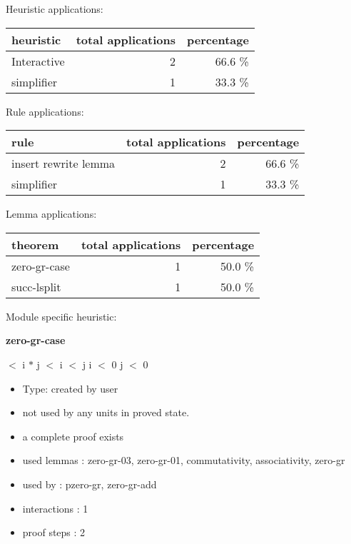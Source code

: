 \documentclass[a4paper]{article}
\begin{document}
\medskip


Heuristic applications:

\begin{supertabular}{l|r|r}
heuristic	& total applications & percentage \\ \hline
Interactive & 2 & 66.6 \% \\
simplifier & 1 & 33.3 \% \\

\end{supertabular}

Rule applications:

\begin{supertabular}{l|r|r}
rule	        & total applications & percentage \\ \hline
insert rewrite lemma & 2 & 66.6 \% \\
simplifier & 1 & 33.3 \% \\

\end{supertabular}

Lemma applications:

\begin{supertabular}{l|r|r}
theorem	        & total applications & percentage \\ \hline
zero-gr-case & 1 & 50.0 \% \\
succ-lsplit & 1 & 50.0 \% \\

\end{supertabular}

Module specific heuristic:

\pagebreak

{\LARGE\bf zero-gr-case}\label{lemma-zero-gr-case}

\medskip

  $<$ i $*$ j  $<$ i  $<$ j \Or i $<$ 0 \And j $<$ 0

\begin{itemize}

\item Type: created by user

\item not used by any units in proved state.
\item       a complete proof exists
\item       used lemmas  : zero-gr-03, zero-gr-01, commutativity, associativity, zero-gr
\item       used by      : pzero-gr, zero-gr-add
\item       interactions : 1
\item       proof steps  : 2
\end{itemize}
\end{document}
